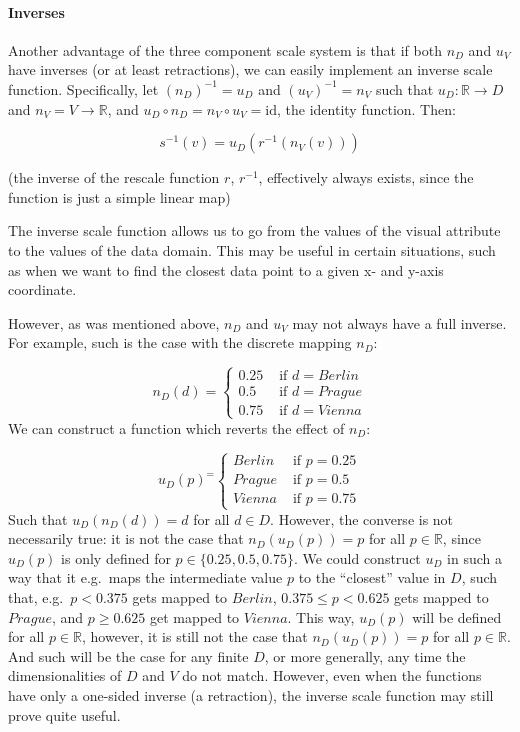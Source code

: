 \documentclass[
  openany]{book}
\theoremstyle{definition}
\theoremstyle{definition}
\theoremstyle{definition}
\theoremstyle{definition}
\theoremstyle{remark}
\begin{document}
\paragraph{Inverses}\label{scaling-inverses}

Another advantage of the three component scale system is that if both \(n_D\) and \(u_V\) have inverses (or at least retractions), we can easily implement an inverse scale function. Specifically, let \((n_D)^{-1} = u_D\) and \((u_V)^{-1} = n_V\) such that \(u_D: \mathbb{R} \to D\) and \(n_V = V \to \mathbb{R}\), and \(u_D \circ n_D = n_V \circ u_V = \text{id}\), the identity function. Then:

\[s^{-1}(v) = u_D(r^{-1}(n_V(v)))\]

(the inverse of the rescale function \(r\), \(r^{-1}\), effectively always exists, since the function is just a simple linear map)

The inverse scale function allows us to go from the values of the visual attribute to the values of the data domain. This may be useful in certain situations, such as when we want to find the closest data point to a given x- and y-axis coordinate.

However, as was mentioned above, \(n_D\) and \(u_V\) may not always have a full inverse. For example, such is the case with the discrete mapping \(n_D\):

\[n_D(d) = \begin{cases} 0.25 & \text{ if } d = Berlin \\ 0.5 & \text{ if } d = Prague \\ 0.75 & \text{ if } d = Vienna  \end{cases}\]
We can construct a function which reverts the effect of \(n_D\):

\[u_D(p)^ = \begin{cases} Berlin & \text{ if } p = 0.25 \\ Prague & \text{ if } p = 0.5 \\ Vienna & \text{ if } p = 0.75  \end{cases}\]
Such that \(u_D(n_D(d)) = d\) for all \(d \in D\). However, the converse is not necessarily true: it is not the case that \(n_D(u_D(p)) = p\) for all \(p \in \mathbb{R}\), since \(u_D(p)\) is only defined for \(p \in \{ 0.25, 0.5, 0.75 \}\). We could construct \(u_D\) in such a way that it e.g.~maps the intermediate value \(p\) to the ``closest'' value in \(D\), such that, e.g.~\(p < 0.375\) gets mapped to \(Berlin\), \(0.375 \leq p < 0.625\) gets mapped to \(Prague\), and \(p \geq 0.625\) get mapped to \(Vienna\). This way, \(u_D(p)\) will be defined for all \(p \in \mathbb{R}\), however, it is still not the case that \(n_D(u_D(p)) = p\) for all \(p \in \mathbb{R}\). And such will be the case for any finite \(D\), or more generally, any time the dimensionalities of \(D\) and \(V\) do not match. However, even when the functions have only a one-sided inverse (a retraction), the inverse scale function may still prove quite useful.
\end{document}
